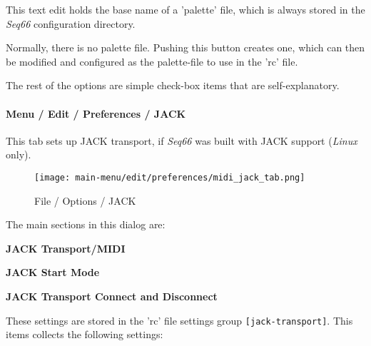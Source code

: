    This text edit holds the base name of a 'palette' file, which is always
   stored in the \textsl{Seq66} configuration directory.

   Normally, there is no palette file.  Pushing this button creates one, which
   can then be modified and configured as the palette-file to use in the 'rc'
   file.

   The rest of the options are simple check-box items that are
   self-explanatory.
 
\paragraph{Menu / Edit / Preferences / JACK}
\label{paragraph:menu_edit_preferences_jack}

   This tab sets up JACK transport, if \textsl{Seq66}
   was built with JACK support (\textsl{Linux} only).

\begin{figure}[H]
   \centering 
   \texttt{[image: main-menu/edit/preferences/midi\_jack\_tab.png]}
   \caption{File / Options / JACK}
   \label{fig:midi_jack_tab}
\end{figure}

   The main sections in this dialog are:

   \begin{enumber}
      \item \textbf{JACK Transport/MIDI}
      \item \textbf{JACK Start Mode}
      \item \textbf{JACK Transport Connect and Disconnect}
   \end{enumber}

   \setcounter{ItemCounter}{0}      %

   These settings are stored in the 'rc' file settings group
   \texttt{[jack-transport]}.
   This items collects the following settings:

